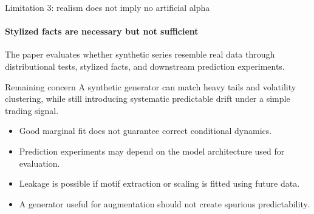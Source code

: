 \begin{frame}{Limitation 3: realism does not imply no artificial alpha}
\framesubtitle{Stylized facts are necessary but not sufficient}

The paper evaluates whether synthetic series resemble real data through distributional tests,
stylized facts, and downstream prediction experiments.

\medskip

\begin{block}{Remaining concern}
A synthetic generator can match heavy tails and volatility clustering, while still introducing
\alert{systematic predictable drift} under a simple trading signal.
\end{block}

\begin{itemize}
\item Good marginal fit does not guarantee correct conditional dynamics.
\item Prediction experiments may depend on the model architecture used for evaluation.
\item Leakage is possible if motif extraction or scaling is fitted using future data.
\item A generator useful for augmentation should not create spurious predictability.
\end{itemize}

\end{frame}

